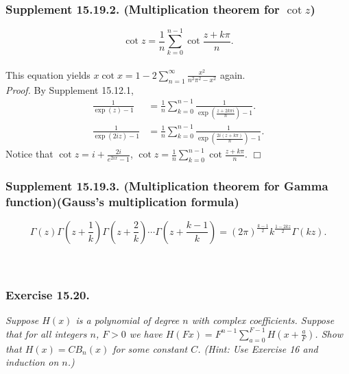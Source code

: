 \documentclass{article}
\begin{document}
\subsubsection*{Supplement 15.19.2. (Multiplication theorem for $\cot z$)}
\emph{$$\cot z = \frac{1}{n} \sum_{k=0}^{n-1} \cot\frac{z + k\pi}{n}.$$} \\

This equation yields
$x \cot x = 1 - 2 \sum_{n=1}^{\infty} \frac{x^2}{n^2 \pi^2 - x^2}$ again. \\

\emph{Proof.}
By Supplement 15.12.1,
\begin{align*}
\frac{1}{\exp(z) - 1}
&=
\frac{1}{n} \sum_{k=0}^{n-1} \frac{1}{\exp(\frac{z + 2 k \pi i}{n}) - 1}. \\
\frac{1}{\exp(2iz) - 1}
&=
\frac{1}{n} \sum_{k=0}^{n-1} \frac{1}{\exp(\frac{2i (z + k \pi)}{n}) - 1}.
\end{align*}
Notice that $\cot z = i + \frac{2i}{e^{2ix} - 1}$,
$\cot z = \frac{1}{n} \sum_{k=0}^{n-1} \cot\frac{z + k\pi}{n}$.
$\Box$ \\



\subsubsection*{Supplement 15.19.3. (Multiplication theorem for Gamma function)(Gauss's multiplication formula)}
\emph{
$$\Gamma(z)
\Gamma\left( z+\frac{1}{k} \right)
\Gamma\left( z+\frac{2}{k} \right) \cdots
\Gamma\left( z+\frac{k-1}{k} \right)
= (2\pi)^{\frac{k-1}{2}} k^{\frac{1-2kz}{2}}
\Gamma\left( kz \right).$$} \\\\






\subsubsection*{Exercise 15.20.}
\emph{Suppose $H(x)$ is a polynomial of degree $n$ with complex coefficients.
Suppose that for all integers $n$, $F > 0$ we have
$H(Fx) = F^{n-1}\sum_{a=0}^{F-1}H(x+\frac{a}{F})$.
Show that $H(x) = CB_n(x)$ for some constant $C$.
(Hint: Use Exercise 16 and induction on $n$.)} \\
\end{document}
